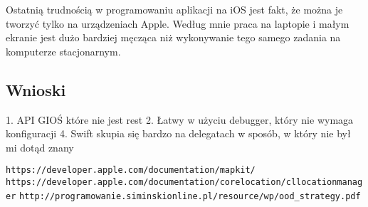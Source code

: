 \documentclass[a4paper,11pt,titlepage]{article}
\begin{document}
Ostatnią trudnością w programowaniu aplikacji na iOS jest fakt, że można je tworzyć tylko na urządzeniach Apple. Według mnie praca na laptopie i małym ekranie jest dużo bardziej męcząca niż wykonywanie tego samego zadania na komputerze stacjonarnym.

\subsection{Wnioski}
1. API GIOŚ które nie jest rest
2. Łatwy w użyciu debugger, który nie wymaga konfiguracji
4. Swift skupia się bardzo na delegatach w sposób, w który nie był mi dotąd znany

\newpage
{}
\listoffigures
\newpage

\begin{thebibliography}{9}
\verb|https://developer.apple.com/documentation/mapkit/|
\verb|https://developer.apple.com/documentation/corelocation/cllocationmanager|
\verb|http://programowanie.siminskionline.pl/resource/wp/ood_strategy.pdf|



\end{thebibliography}
\end{document}
